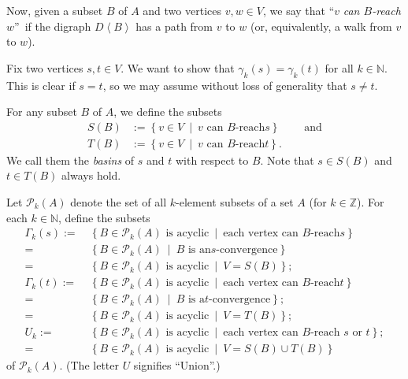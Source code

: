 \documentclass[numbers=enddot,12pt,final,onecolumn,notitlepage]{scrartcl}%
\theoremstyle{definition}
\theoremstyle{plainsl}
\begin{document}
Now, given a subset $B$ of $A$ and two vertices $v,w\in V$, we say that
\textquotedblleft$v$ \emph{can $B$-reach} $w$\textquotedblright\ if the
digraph $D\left\langle B\right\rangle $ has a path from $v$ to $w$ (or,
equivalently, a walk from $v$ to $w$).

Fix two vertices $s,t\in V$. We want to show that $\gamma_{k}\left(  s\right)
=\gamma_{k}\left(  t\right)  $ for all $k\in\mathbb{N}$. This is clear if
$s=t$, so we may assume without loss of generality that $s\neq t$.

For any subset $B$ of $A$, we define the subsets%
\begin{align*}
S\left(  B\right)   &  :=\left\{  v\in V\ \mid\ v\text{ can }B\text{-reach
}s\right\}  \ \ \ \ \ \ \ \ \ \ \text{and}\\
T\left(  B\right)   &  :=\left\{  v\in V\ \mid\ v\text{ can }B\text{-reach
}t\right\}  .
\end{align*}
We call them the \emph{basins} of $s$ and $t$ with respect to $B$. Note that
$s\in S\left(  B\right)  $ and $t\in T\left(  B\right)  $ always hold.

Let $\mathcal{P}_{k}\left(  A\right)  $ denote the set of all $k$-element
subsets of a set $A$ (for $k\in\mathbb{Z}$). For each $k\in\mathbb{N}$, define
the subsets
\begin{align*}
\Gamma_{k}\left(  s\right)  :=  &  \ \left\{  B\in\mathcal{P}_{k}\left(
A\right)  \text{ is acyclic}\ \mid\ \text{each vertex can }B\text{-reach
}s\right\} \\
=  &  \ \left\{  B\in\mathcal{P}_{k}\left(  A\right)  \ \mid\ B\text{ is an
}s\text{-convergence}\right\} \\
=  &  \ \left\{  B\in\mathcal{P}_{k}\left(  A\right)  \text{ is acyclic}%
\ \mid\ V=S\left(  B\right)  \right\}  ;\\
\Gamma_{k}\left(  t\right)  :=  &  \ \left\{  B\in\mathcal{P}_{k}\left(
A\right)  \text{ is acyclic}\ \mid\ \text{each vertex can }B\text{-reach
}t\right\} \\
=  &  \ \left\{  B\in\mathcal{P}_{k}\left(  A\right)  \ \mid\ B\text{ is a
}t\text{-convergence}\right\}  ;\\
=  &  \ \left\{  B\in\mathcal{P}_{k}\left(  A\right)  \text{ is acyclic}%
\ \mid\ V=T\left(  B\right)  \right\}  ;\\
U_{k}:=  &  \ \left\{  B\in\mathcal{P}_{k}\left(  A\right)  \text{ is
acyclic}\ \mid\ \text{each vertex can }B\text{-reach }s\text{ or }t\right\}
;\\
=  &  \ \left\{  B\in\mathcal{P}_{k}\left(  A\right)  \text{ is acyclic}%
\ \mid\ V=S\left(  B\right)  \cup T\left(  B\right)  \right\}
\end{align*}
of $\mathcal{P}_{k}\left(  A\right)  $. (The letter $U$ signifies
\textquotedblleft Union\textquotedblright.)
\end{document}

